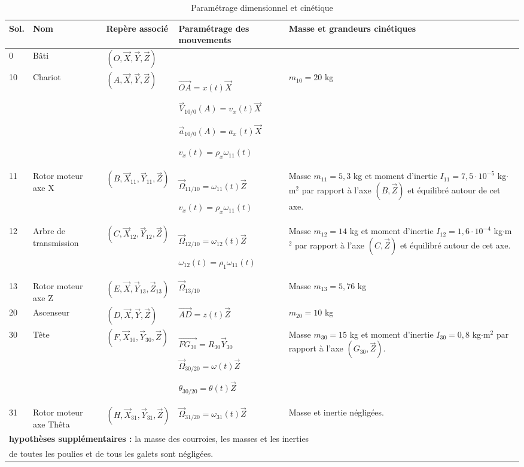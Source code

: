 \begin{table}[ht!]
\begin{tabular}{|m{0.5cm}|m{2cm}|m{3cm}|m{3.5cm}|m{6cm}|}
\hline
\textbf{Sol.} & \textbf{Nom} & \textbf{Repère associé} & \textbf{Paramétrage des mouvements} & \textbf{Masse et grandeurs cinétiques} \\
\hline
0 & Bâti & $(O,\vec{X},\vec{Y},\vec{Z})$ & & \\
\hline
10 & Chariot & $(A,\vec{X},\vec{Y},\vec{Z})$ & $\overrightarrow{OA} = x(t)\vec{X}$ 

$\vec{V}_{10/0}(A) = v_x(t)\vec{X}$

$\vec{a}_{10/0}(A) = a_x(t)\vec{X}$

$v_x(t) = \rho_x \omega_{11}(t)$ & $m_{10} = 20$ kg \\
\hline
11 & Rotor moteur axe X & $(B,\vec{X}_{11},\vec{Y}_{11},\vec{Z})$ & $\vec{\Omega}_{11/10} = \omega_{11}(t)\vec{Z}$

$v_x(t) = \rho_x \omega_{11}(t)$ & Masse $m_{11} = 5{,}3$ kg et moment d'inertie $I_{11} = 7,5 \cdot 10^{-5}$ kg$\cdot$m$^2$ par rapport à l'axe $(B,\vec{Z})$ et équilibré autour de cet axe. \\
\hline
12 & Arbre de transmission & $(C,\vec{X}_{12},\vec{Y}_{12},\vec{Z})$ & $\vec{\Omega}_{12/10} = \omega_{12}(t)\vec{Z}$

$\omega_{12}(t) = \rho_1 \omega_{11}(t)$ & Masse $m_{12} = 14$ kg et moment d'inertie $I_{12} = 1{,}6 \cdot 10^{-4}$ kg$\cdot$m$^2$ par rapport à l'axe $(C,\vec{Z})$ et équilibré autour de cet axe. \\
\hline
13 & Rotor moteur axe Z & $(E,\vec{X},\vec{Y}_{13},\vec{Z}_{13})$ & $\vec{\Omega}_{13/10}$ & Masse $m_{13} = 5{,}76$ kg \\
\hline
20 & Ascenseur & $(D,\vec{X},\vec{Y},\vec{Z})$ & $\overrightarrow{AD} = z(t)\vec{Z}$ & $m_{20} = 10$ kg \\
\hline
30 & Tête & $(F,\vec{X}_{30},\vec{Y}_{30},\vec{Z})$ & $\overrightarrow{FG_{30}} = R_{30}\vec{Y}_{30}$

$\vec{\Omega}_{30/20} = \omega(t)\vec{Z}$

$\theta_{30/20} = \theta(t)\vec{Z}$ & Masse $m_{30} = 15$ kg et moment d'inertie $I_{30} = 0{,}8$ kg$\cdot$m$^2$ par rapport à l'axe $(G_{30},\vec{Z})$. \\
\hline
31 & Rotor moteur axe Thêta & $(H,\vec{X}_{31},\vec{Y}_{31},\vec{Z})$ & $\vec{\Omega}_{31/20} = \omega_{31}(t)\vec{Z}$ & Masse et inertie négligées. \\
\hline
\multicolumn{5}{|l|}{\textbf{hypothèses supplémentaires :} la masse des courroies, les masses et les inerties}\\
\multicolumn{5}{|l|}{de toutes les poulies et de tous les galets sont négligées.} \\
\hline
\end{tabular}
\caption{\label{tab02}Paramétrage dimensionnel et cinétique}
\end{table}

